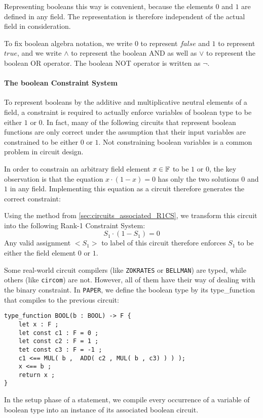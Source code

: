 Representing booleans this way is convenient, because the elements $0$ and $1$ are defined in any field. The representation is therefore independent of the actual field in consideration. 

To fix boolean algebra notation, we write $0$ to represent $false$ and $1$ to represent $true$, and we write $\wedge$ to represent the boolean AND as well as $\vee$ to represent the boolean OR operator. The boolean NOT operator is written as $\lnot$. 
\paragraph{The boolean Constraint System}
\label{def:boolean_constraint} To represent booleans by the additive and multiplicative neutral elements of a field, a constraint is required to actually enforce variables of boolean type to be either $1$ or $0$. In fact, many of the following circuits that represent boolean functions are only correct under the assumption that their input variables are constrained to be either $0$ or $1$. Not constraining boolean variables is a common problem in circuit design.

In order to constrain an arbitrary field element $x\in \mathbb{F}$ to be $1$ or $0$, the key observation is that the equation $x \cdot (1-x) =0$ has only the two solutions $0$ and $1$ in any field. Implementing this equation as a circuit therefore generates the correct constraint:
\begin{center}
\end{center}
Using the method from \ref{sec:circuits_associated_R1CS}, we transform this circuit into the following Rank-1 Constraint System:
$$
S_1 \cdot (1-S_1) = 0
$$
Any valid assignment $<S_1>$ to label of this circuit therefore enforces $S_1$ to be either the field element $0$ or $1$. 

Some real-world circuit compilers (like \texttt{ZOKRATES} or \texttt{BELLMAN}) are typed, while others (like \texttt{circom}) are not. However, all of them have their way of dealing with the binary constraint. In \texttt{PAPER}, we define the boolean type by its type\_function that compiles to the previous circuit:
\begin{lstlisting}
type_function BOOL(b : BOOL) -> F { 
	let x : F ;
	let const c1 : F = 0 ;
	let const c2 : F = 1 ;
	tet const c3 : F = -1 ;
    c1 <== MUL( b ,  ADD( c2 , MUL( b , c3) ) ) );
    x <== b ;
    return x ;
}
\end{lstlisting}
In the setup phase of a statement, we compile every occurrence of a variable of boolean type into an instance of its associated boolean circuit.

